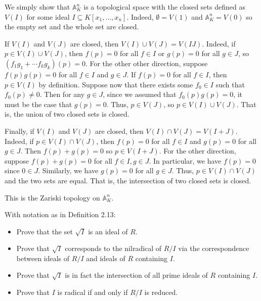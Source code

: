 \documentclass[../../master.tex]{subfiles}
\begin{document}
\begin{solution}
    We simply show that $\mathbb{A}^{n}_K$ is a topological space with the closed sets defined as $V(I)$ for some ideal $I \subseteq K[x_1, \ldots, x_n]$.
    Indeed, $\emptyset = V(1)$ and $\mathbb{A}^{n}_K = V(0)$ so the empty set and the whole set are closed.

    If $V(I)$ and $V(J)$ are closed, then $V(I) \cup V(J) = V(IJ)$.
    Indeed, if $p \in V(I) \cup V(J)$, then $f(p) = 0$ for all $f \in I$ or $g(p) = 0$ for all $g \in J$, so $(f_1 g_1 + \cdots f_k g_k)(p) = 0$.
    For the other other direction, suppose $f(p) g(p) = 0$ for all $f \in I$ and $g \in J$.
    If $f(p) = 0$ for all $f \in I$, then $p \in V(I)$ by definition.
    Suppose now that there exists some $f_0 \in I$ such that $f_0(p) \neq 0$.
    Then for any $g \in J$, since we assumed that $f_0(p) g(p) = 0$, it must be the case that $g(p) = 0$.
    Thus, $p \in V(J)$, so $p \in V(I) \cup V(J)$.
    That is, the union of two closed sets is closed.

    Finally, if $V(I)$ and $V(J)$ are closed, then $V(I) \cap V(J) = V(I + J)$.
    Indeed, if $p \in V(I) \cap V(J)$, then $f(p) = 0$ for all $f \in I$ and $g(p) = 0$ for all $g \in J$.
    Then $f(p) + g(p) = 0$ so $p \in V(I + J)$.
    For the other direction, suppose $f(p) + g(p) = 0$ for all $f \in I, g \in J$.
    In particular, we have $f(p) = 0$ since $0 \in J$.
    Similarly, we have $g(p) = 0$ for all $g \in J$.
    Thus, $p \in V(I) \cap V(J)$ and the two sets are equal.
    That is, the intersection of two closed sets is closed.

    This is the Zariski topology on $\mathbb{A}^{n}_K$.
\end{solution}

\begin{problem}
    With notation as in Definition 2.13:
    \begin{itemize}
        \item Prove that the set $\sqrt{I}$ is an ideal of $R$.
        \item Prove that $\sqrt{I}$ corresponds to the nilradical of $R / I$ via the correspondence between ideals of $R / I$ and ideals of $R$ containing $I$.
        \item Prove that $\sqrt{I}$ is in fact the intersection of all prime ideals of $R$ containing $I$.
        \item Prove that $I$ is radical if and only if $R / I$ is reduced.
    \end{itemize}
\end{problem}
\end{document}
